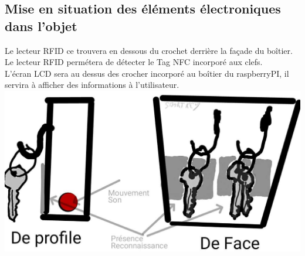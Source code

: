 \documentclass[12pt]{article}
\begin{document}
\subsection{Mise en situation des éléments électroniques dans l’objet}

Le lecteur RFID ce trouvera en dessous du crochet derrière la façade du boîtier. Le lecteur RFID permétera de détecter le Tag NFC incorporé aux clefs.  \\
L'écran LCD sera au dessus des crocher incorporé au boîtier du raspberryPI, il servira à afficher des informations à l'utilisateur.\\

\includegraphics[scale=0.130]{Chroquis.jpg} 
\end{document}
